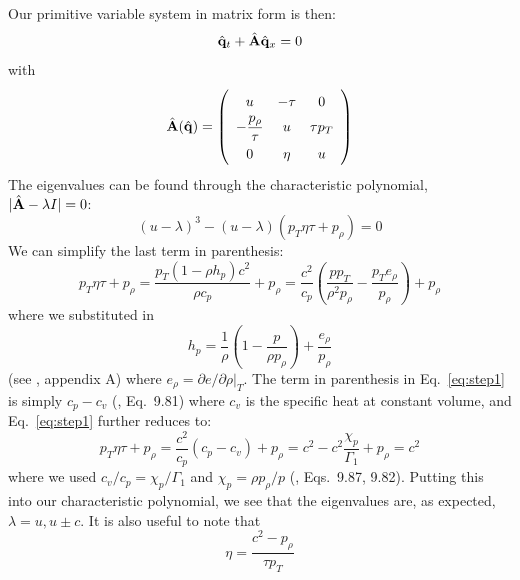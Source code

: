 Our primitive variable system in matrix form is then:
\begin{equation}
\hat{{\bf q}}_t + \hat{{\bf A}} \hat{{\bf q}}_x = 0
\end{equation}
with
\begin{equation}
\renewcommand{\arraystretch}{1.5}
\hat{\Ab}(\hat{\qb}) =
\left (
\begin{array}{ccc}
u                   & -\tau & 0 \\
-\dfrac{p_\rho}{\tau} & u    & \tau p_T \\
0                   & \eta & u
\end{array}
\right )
\end{equation}
The eigenvalues can be found through the characteristic polynomial,
$|\hat{{\bf A}} - \lambda I| = 0$:
\begin{equation}
(u - \lambda)^3 - (u -\lambda) \left ( {p_T \eta\tau} + p_\rho \right ) = 0
\end{equation}
We can simplify the last term in parenthesis:
\begin{equation}
{p_T \eta\tau} + p_\rho = \frac{p_T (1 - \rho h_p) c^2}{\rho c_p} + p_\rho
                               = \frac{c^2}{c_p}\left ( \frac{p p_T}{\rho^2 p_\rho} - \frac{p_T e_\rho}{p_\rho} \right ) + p_\rho \label{eq:step1}
\end{equation}
where we substituted in
\begin{equation}
h_p = \frac{1}{\rho} \left ( 1 - \frac{p}{\rho p_\rho} \right ) + \frac{e_\rho}{p_\rho}
\end{equation}
(see \cite{ABRZ:I}, appendix A) where $e_\rho = \partial e/\partial
\rho |_T$.  The term in parenthesis in Eq.~\ref{eq:step1} is simply
$c_p - c_v$ (\cite{cg}, Eq.~9.81) where $c_v$ is the specific heat
at constant volume, and Eq.~\ref{eq:step1} further reduces to:
\begin{equation}
{p_T \eta\tau} + p_\rho = \frac{c^2}{c_p} (c_p - c_v) + p_\rho
                               = c^2 - c^2 \frac{\chi_p}{\Gamma_1} + p_\rho = c^2
\end{equation}
where we used $c_v/c_p = \chi_p/\Gamma_1$ and $\chi_p = \rho p_\rho /
p$ (\cite{cg}, Eqs.~9.87, 9.82).  Putting this into our
characteristic polynomial, we see that the eigenvalues are, as expected,
$\lambda = u, u \pm c$.  It is also useful to note that
\begin{equation}
\eta = \frac{c^2 - p_\rho}{\tau p_T}
\end{equation}


